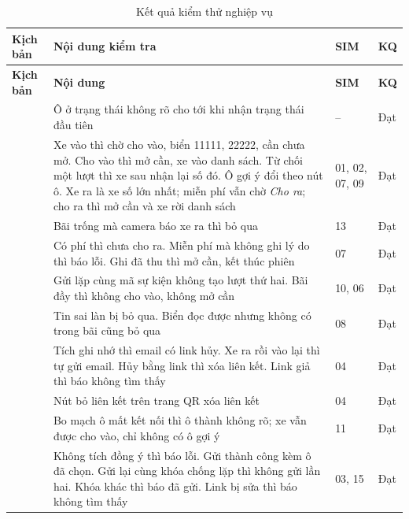 \begin{longtable}{@{}P{5.2cm}P{6.6cm}P{1.6cm}P{0.8cm}@{}}
\caption{Kết quả kiểm thử nghiệp vụ}\label{tab:unittest}\\
\toprule
\textbf{Kịch bản} & \textbf{Nội dung kiểm tra} & \textbf{SIM} & \textbf{KQ} \\ \midrule
\endfirsthead
\toprule
\textbf{Kịch bản} & \textbf{Nội dung} & \textbf{SIM} & \textbf{KQ} \\ \midrule
\endhead
{} & Ô ở trạng thái không rõ cho tới khi nhận trạng thái đầu tiên & -- & Đạt \\
 & Xe vào thì chờ cho vào, biển 11111, 22222, cần chưa mở. Cho vào thì mở cần, xe vào danh sách. Từ chối một lượt thì xe sau nhận lại số đó. Ô gợi ý đổi theo nút ô. Xe ra là xe số lớn nhất; miễn phí vẫn chờ \emph{Cho ra}; cho ra thì mở cần và xe rời danh sách & 01, 02, 07, 09 & Đạt \\
 & Bãi trống mà camera báo xe ra thì bỏ qua & 13 & Đạt \\
 & Có phí thì chưa cho ra. Miễn phí mà không ghi lý do thì báo lỗi. Ghi đã thu thì mở cần, kết thúc phiên & 07 & Đạt \\
 & Gửi lặp cùng mã sự kiện không tạo lượt thứ hai. Bãi đầy thì không cho vào, không mở cần & 10, 06 & Đạt \\
 & Tin sai làn bị bỏ qua. Biển đọc được nhưng không có trong bãi cũng bỏ qua & 08 & Đạt \\
 & Tích ghi nhớ thì email có link hủy. Xe ra rồi vào lại thì tự gửi email. Hủy bằng link thì xóa liên kết. Link giả thì báo không tìm thấy & 04 & Đạt \\
 & Nút bỏ liên kết trên trang QR xóa liên kết & 04 & Đạt \\
 & Bo mạch ô mất kết nối thì ô thành không rõ; xe vẫn được cho vào, chỉ không có ô gợi ý & 11 & Đạt \\
 & Không tích đồng ý thì báo lỗi. Gửi thành công kèm ô đã chọn. Gửi lại cùng khóa chống lặp thì không gửi lần hai. Khóa khác thì báo đã gửi. Link bị sửa thì báo không tìm thấy & 03, 15 & Đạt \\

\end{longtable}
